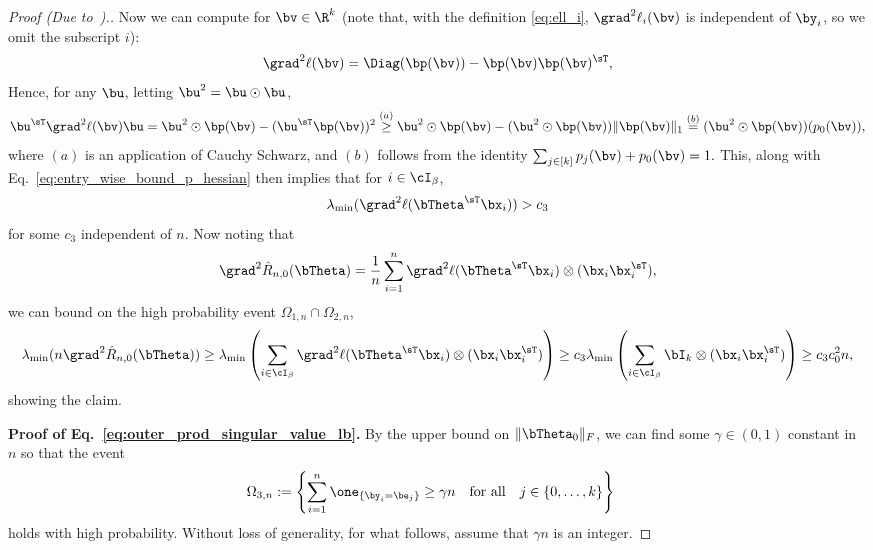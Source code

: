 \begin{proof}[Proof (Due to~\cite{tan2024multinomial}).]
Now we can compute for $\bv\in\R^k$ (note that, with the definition \eqref{eq:ell_i}, $\grad^2 \ell_i(\bv)$ is independent of $\by_i$, so we omit the subscript $i$):
\begin{equation}
    \grad^2 \ell(\bv) = \Diag(\bp(\bv)) - \bp(\bv)\bp(\bv)^\sT,
\end{equation}
Hence, for any $\bu$, letting $\bu^2 = \bu\odot \bu$,
\begin{equation}
  \bu^\sT \grad^2 \ell(\bv)\bu   = \bu^2 \odot \bp(\bv) - (\bu^\sT\bp(\bv))^2
  \stackrel{(a)}{\ge}
 \bu^2 \odot \bp(\bv) - (\bu^2 \odot \bp(\bv))\|\bp(\bv)\|_1  \stackrel{(b)}{=} 
 (\bu^2 \odot \bp(\bv)) (p_0(\bv)),
\end{equation}
where $(a)$ is an application of Cauchy Schwarz, and $(b)$ follows from the identity  $\sum_{j\in[k]}p_j(\bv) + p_0(\bv) = 1.$
This, along with Eq.~\eqref{eq:entry_wise_bound_p_hessian} then implies
that for $i\in \cI_\beta$, 
\begin{equation}
    \lambda_{\min}(\grad^2 \ell(\bTheta^\sT\bx_i))  > c_3
\end{equation}
for some $c_3$ independent of $n$.
Now noting that
\begin{equation}
\grad^2 \hat R_{n,0}(\bTheta) = \frac1n\sum_{i=1}^n \grad^2\ell(\bTheta^\sT\bx_i) \otimes (\bx_i\bx_i^\sT),
\end{equation}
we can bound 
on the high probability event $\Omega_{1,n}\cap\Omega_{2,n}$,
\begin{align}
    \lambda_{\min}(n\grad^2 \hat R_{n,0}(\bTheta)) 
    \ge
    \lambda_{\min}\left(\sum_{i\in\cI_\beta} \grad^2\ell(\bTheta^\sT\bx_i) \otimes (\bx_i\bx_i^\sT)\right)
    \ge 
    c_3 \lambda_{\min}\left(\sum_{i\in\cI_\beta} \bI_k \otimes (\bx_i\bx_i^\sT)\right)
    \ge c_3 c_0^2 n,
\end{align}
showing the claim.


\noindent
\textbf{Proof of Eq.~\eqref{eq:outer_prod_singular_value_lb}.}
By the upper bound on $\|\bTheta_0\|_F$, we can find some $\gamma\in(0,1)$ constant in $n$ so that the event
\begin{align}
\Omega_{3,n} &:= \left\{\sum_{i=1}^n \one_{\{\by_i = \be_{j}\}} \ge \gamma n  \quad\textrm{for all}\quad j \in\{0,\dots,k\} \right\}
\end{align} 
holds with high probability.
Without loss of generality, for what follows, assume that $\gamma n$ is an integer.


\end{proof}
